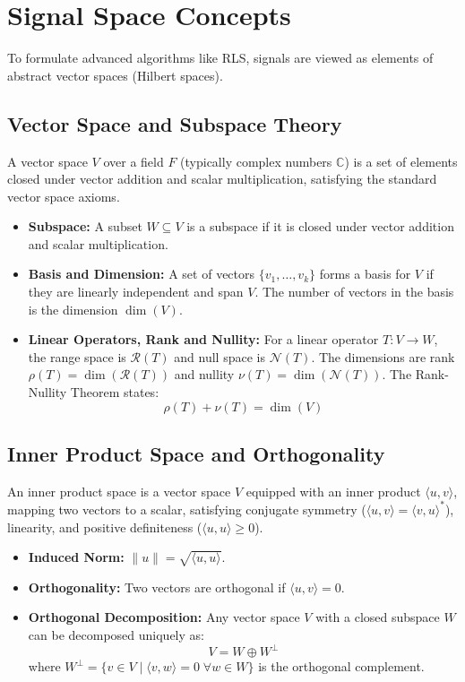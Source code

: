 \documentclass[12pt,a4paper]{article}
\begin{document}
\section{Signal Space Concepts}

To formulate advanced algorithms like RLS, signals are viewed as elements of abstract vector spaces (Hilbert spaces).

\subsection{Vector Space and Subspace Theory}
A vector space $V$ over a field $F$ (typically complex numbers $\mathbb{C}$) is a set of elements closed under vector addition and scalar multiplication, satisfying the standard vector space axioms.
\begin{itemize}[leftmargin=*, itemsep=3pt]
  \item \textbf{Subspace:} A subset $W \subseteq V$ is a subspace if it is closed under vector addition and scalar multiplication.
  \item \textbf{Basis and Dimension:} A set of vectors $\{v_1, \dots, v_k\}$ forms a basis for $V$ if they are linearly independent and span $V$. The number of vectors in the basis is the dimension $\dim(V)$.
  \item \textbf{Linear Operators, Rank and Nullity:} For a linear operator $T: V \to W$, the range space is $\mathcal{R}(T)$ and null space is $\mathcal{N}(T)$. The dimensions are rank $\rho(T) = \dim(\mathcal{R}(T))$ and nullity $\nu(T) = \dim(\mathcal{N}(T))$. The Rank-Nullity Theorem states:
  \begin{equation}
    \rho(T) + \nu(T) = \dim(V)
  \end{equation}
\end{itemize}

\subsection{Inner Product Space and Orthogonality}
An inner product space is a vector space $V$ equipped with an inner product $\langle u, v \rangle$, mapping two vectors to a scalar, satisfying conjugate symmetry ($\langle u,v \rangle = \langle v,u \rangle^*$), linearity, and positive definiteness ($\langle u,u \rangle \ge 0$).
\begin{itemize}[leftmargin=*, itemsep=2pt]
  \item \textbf{Induced Norm:} $\|u\| = \sqrt{\langle u, u \rangle}$.
  \item \textbf{Orthogonality:} Two vectors are orthogonal if $\langle u, v \rangle = 0$.
  \item \textbf{Orthogonal Decomposition:} Any vector space $V$ with a closed subspace $W$ can be decomposed uniquely as:
  \begin{equation}
    V = W \oplus W^\perp
  \end{equation}
  where $W^\perp = \{v \in V \mid \langle v, w \rangle = 0 \; \forall w \in W\}$ is the orthogonal complement.
\end{itemize}
\end{document}
